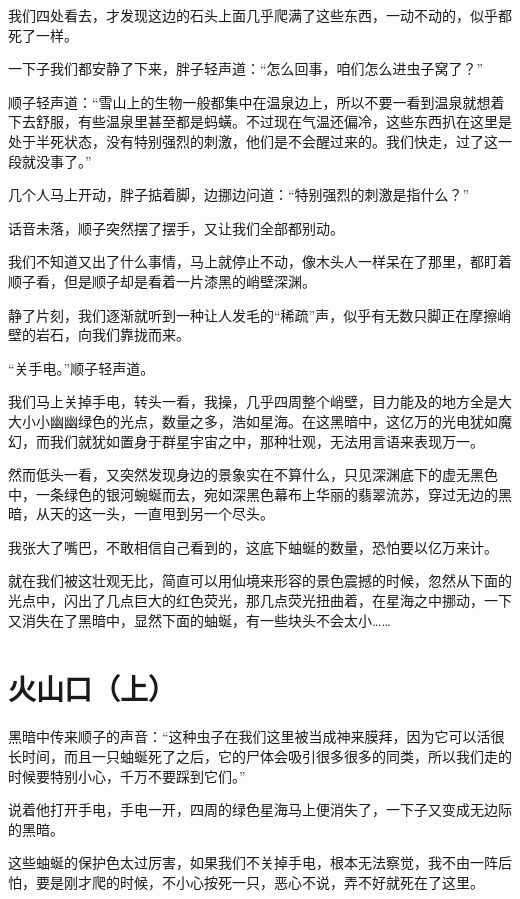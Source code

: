 我们四处看去，才发现这边的石头上面几乎爬满了这些东西，一动不动的，似乎都死了一样。

一下子我们都安静了下来，胖子轻声道：“怎么回事，咱们怎么进虫子窝了？”

顺子轻声道：“雪山上的生物一般都集中在温泉边上，所以不要一看到温泉就想着下去舒服，有些温泉里甚至都是蚂蟥。不过现在气温还偏冷，这些东西扒在这里是处于半死状态，没有特别强烈的刺激，他们是不会醒过来的。我们快走，过了这一段就没事了。”

几个人马上开动，胖子掂着脚，边挪边问道：“特别强烈的刺激是指什么？”

话音未落，顺子突然摆了摆手，又让我们全部都别动。

我们不知道又出了什么事情，马上就停止不动，像木头人一样呆在了那里，都盯着顺子看，但是顺子却是看着一片漆黑的峭壁深渊。

静了片刻，我们逐渐就听到一种让人发毛的“稀疏”声，似乎有无数只脚正在摩擦峭壁的岩石，向我们靠拢而来。

“关手电。”顺子轻声道。

我们马上关掉手电，转头一看，我操，几乎四周整个峭壁，目力能及的地方全是大大小小幽幽绿色的光点，数量之多，浩如星海。在这黑暗中，这亿万的光电犹如魔幻，而我们就犹如置身于群星宇宙之中，那种壮观，无法用言语来表现万一。

然而低头一看，又突然发现身边的景象实在不算什么，只见深渊底下的虚无黑色中，一条绿色的银河蜿蜒而去，宛如深黑色幕布上华丽的翡翠流苏，穿过无边的黑暗，从天的这一头，一直甩到另一个尽头。

我张大了嘴巴，不敢相信自己看到的，这底下蚰蜒的数量，恐怕要以亿万来计。

就在我们被这壮观无比，简直可以用仙境来形容的景色震撼的时候，忽然从下面的光点中，闪出了几点巨大的红色荧光，那几点荧光扭曲着，在星海之中挪动，一下又消失在了黑暗中，显然下面的蚰蜒，有一些块头不会太小……

\chapter{火山口（上）}

黑暗中传来顺子的声音：“这种虫子在我们这里被当成神来膜拜，因为它可以活很长时间，而且一只蚰蜒死了之后，它的尸体会吸引很多很多的同类，所以我们走的时候要特别小心，千万不要踩到它们。”

说着他打开手电，手电一开，四周的绿色星海马上便消失了，一下子又变成无边际的黑暗。

这些蚰蜒的保护色太过厉害，如果我们不关掉手电，根本无法察觉，我不由一阵后怕，要是刚才爬的时候，不小心按死一只，恶心不说，弄不好就死在了这里。

